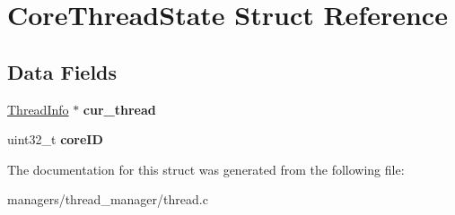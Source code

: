 \hypertarget{structCoreThreadState}{}\section{Core\+Thread\+State Struct Reference}
\label{structCoreThreadState}
\subsection*{Data Fields}
\begin{DoxyCompactItemize}
\item 
\hyperlink{structThreadInfo}{Thread\+Info} $\ast$ {\bfseries cur\+\_\+thread}\hypertarget{structCoreThreadState_acb33172385cc6de66a05b90629b15c8f}{}\label{structCoreThreadState_acb33172385cc6de66a05b90629b15c8f}

\item 
uint32\+\_\+t {\bfseries core\+ID}\hypertarget{structCoreThreadState_afaeddd38fcd59dbf10fb292a6f0da409}{}\label{structCoreThreadState_afaeddd38fcd59dbf10fb292a6f0da409}

\end{DoxyCompactItemize}


The documentation for this struct was generated from the following file\+:\begin{DoxyCompactItemize}
\item 
managers/thread\+\_\+manager/thread.\+c\end{DoxyCompactItemize}
